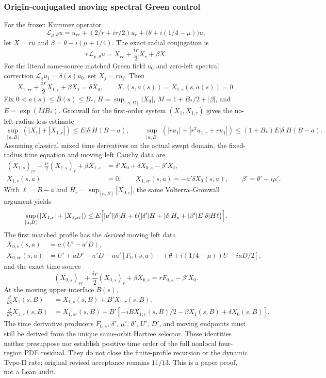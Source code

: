 \subsubsection*{Origin-conjugated moving spectral Green control}
For the frozen Kummer operator
\[
\mathcal L_{\mu,\theta}u=u_{rr}+
(2/r+ir/2)u_r+
\bigl(\theta+i(1/4-\mu)\bigr)u,
\]
let \(X=ru\) and \(\beta=\theta-i(\mu+1/4)\). The exact radial
conjugation is
\[
r\mathcal L_{\mu,\theta}u
=X_{rr}+\frac{ir}{2}X_r+\beta X.
\]
For the literal same-source matched Green field \(u_0\) and zero-left
spectral correction \(\mathcal L_su_1=\delta(s)u_0\), set \(X_j=ru_j\).
Then
\[
X_{1,rr}+\frac{ir}{2}X_{1,r}+\beta X_1=\delta X_0,
\qquad X_1(s,a(s))=X_{1,r}(s,a(s))=0.
\]
Fix \(0<a(s)\le B(s)\le B_*\), \(H=\sup_{[a,B]}|X_0|\),
\(M=1+B_*/2+|\beta|\), and \(E=\exp(MB_*)\). Gronwall for the
first-order system \((X_1,X_{1,r})\) gives the no-left-radius-loss estimate
\[
\sup_{[a,B]}(|X_1|+|X_{1,r}|)
\le E|\delta|H(B-a),\qquad
\sup_{[a,B]}(|ru_1|+|r^2u_{1,r}+ru_1|)
\le(1+B_*)E|\delta|H(B-a).
\]
Assuming classical mixed time derivatives on the actual swept
domain, the fixed-radius time equation and moving left Cauchy data are
\[
\begin{aligned}
(X_{1,s})_{rr}+\frac{ir}{2}(X_{1,s})_r+\beta X_{1,s}
 &=\delta'X_0+\delta X_{0,s}-\beta'X_1,\\
X_{1,s}(s,a)&=0,\qquad
X_{1,sr}(s,a)=-a'\delta X_0(s,a),
\qquad\beta'=\theta'-i\mu'.
\end{aligned}
\]
With \(\ell=B-a\) and \(H_s=\sup_{[a,B]}|X_{0,s}|\), the
same Volterra--Gronwall argument yields
\[
\sup_{[a,B]}(|X_{1,s}|+|X_{1,sr}|)
\le E\Bigl[|a'||\delta|H+
\ell\bigl(|\delta'|H+|\delta|H_s+
|\beta'|E|\delta|H\ell\bigr)\Bigr].
\]
The first matched profile has the \emph{derived} moving left data
\[
\begin{aligned}
X_{0,s}(s,a)&=a(U'-a'D),\\
X_{0,sr}(s,a)&=U'+aD'+a'D-
aa'[F_0(s,a)-(\theta+i(1/4-\mu))U-iaD/2],
\end{aligned}
\]
and the exact time source
\[
(X_{0,s})_{rr}+\frac{ir}{2}(X_{0,s})_r+\beta X_{0,s}
=rF_{0,s}-\beta'X_0.
\]
At the moving upper interface \(B(s)\),
\[
\begin{aligned}
\frac{d}{ds}X_1(s,B)
 &=X_{1,s}(s,B)+B'X_{1,r}(s,B),\\
\frac{d}{ds}X_{1,r}(s,B)
 &=X_{1,sr}(s,B)+B'
 [-iBX_{1,r}(s,B)/2-\beta X_1(s,B)+\delta X_0(s,B)].
\end{aligned}
\]
The time derivative producers \(F_{0,s}\), \(\delta'\), \(\mu'\),
\(\theta'\), \(U'\), \(D'\), and moving endpoints must still be
derived from the unique same-orbit Hartree selector. These identities
neither presuppose nor establish positive time order of the full
nonlocal four-region PDE residual. They do not close the finite-profile
recursion or the dynamic Type-II rate; original revised acceptance
remains \(11/13\). This is a paper proof, not a Lean audit.

